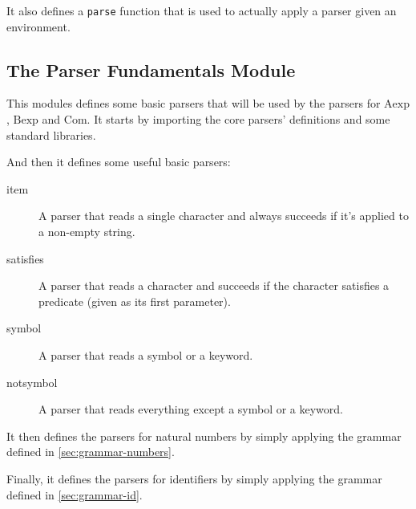\documentclass{esposito-documentation}
\begin{document}






It also defines a \lstinline|parse| function that is used to actually apply a
parser given an environment.


\subsection{The Parser Fundamentals Module}


This modules defines some basic parsers that will be used by the parsers for
$\mathrm{Aexp}$, $\mathrm{Bexp}$ and $\mathrm{Com}$. It starts by importing the
core parsers' definitions and some standard libraries.



And then it defines some useful basic parsers:
\begin{description}
	\item[item] A parser that reads a single character and always succeeds if
		it's applied to a non-empty string.
	\item[satisfies] A parser that reads a character and succeeds if the
		character satisfies a predicate (given as its first parameter).
	\item[symbol] A parser that reads a symbol or a keyword.
	\item[notsymbol] A parser that reads everything except a symbol or a
		keyword.
\end{description}




It then defines the parsers for natural numbers by simply applying the grammar
defined in \autoref{sec:grammar-numbers}.



Finally, it defines the parsers for identifiers by simply applying the grammar
defined in \autoref{sec:grammar-id}.


\end{document}
